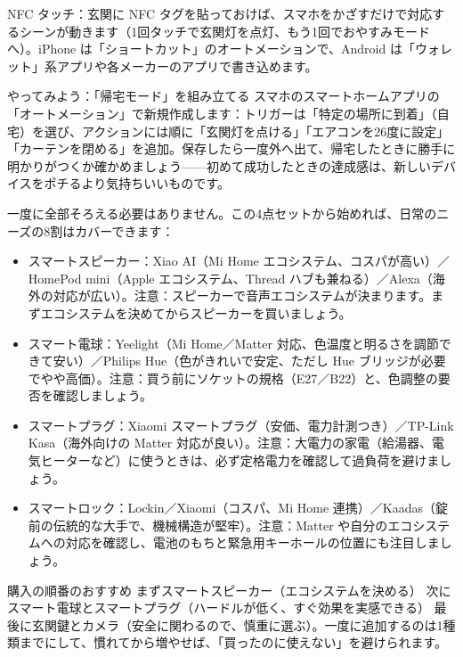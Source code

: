 NFC タッチ：玄関に NFC タグを貼っておけば、スマホをかざすだけで対応するシーンが動きます（1回タッチで玄関灯を点灯、もう1回でおやすみモードへ）。iPhone は「ショートカット」のオートメーションで、Android は「ウォレット」系アプリや各メーカーのアプリで書き込めます。

\begin{tcbpractice}{やってみよう：「帰宅モード」を組み立てる}
スマホのスマートホームアプリの「オートメーション」で新規作成します：トリガーは「特定の場所に到着」（自宅）を選び、アクションには順に「玄関灯を点ける」「エアコンを26度に設定」「カーテンを閉める」を追加。保存したら一度外へ出て、帰宅したときに勝手に明かりがつくか確かめましょう——初めて成功したときの達成感は、新しいデバイスをポチるより気持ちいいものです。

\end{tcbpractice}


一度に全部そろえる必要はありません。この4点セットから始めれば、日常のニーズの8割はカバーできます：

\begin{itemize}
  \item スマートスピーカー：Xiao AI（Mi Home エコシステム、コスパが高い）／HomePod mini（Apple エコシステム、Thread ハブも兼ねる）／Alexa（海外の対応が広い）。注意：スピーカーで音声エコシステムが決まります。まずエコシステムを決めてからスピーカーを買いましょう。
  \item スマート電球：Yeelight（Mi Home／Matter 対応、色温度と明るさを調節できて安い）／Philips Hue（色がきれいで安定、ただし Hue ブリッジが必要でやや高価）。注意：買う前にソケットの規格（E27／B22）と、色調整の要否を確認しましょう。
  \item スマートプラグ：Xiaomi スマートプラグ（安価、電力計測つき）／TP-Link Kasa（海外向けの Matter 対応が良い）。注意：大電力の家電（給湯器、電気ヒーターなど）に使うときは、必ず定格電力を確認して過負荷を避けましょう。
  \item スマートロック：Lockin／Xiaomi（コスパ、Mi Home 連携）／Kaadas（錠前の伝統的な大手で、機械構造が堅牢）。注意：Matter や自分のエコシステムへの対応を確認し、電池のもちと緊急用キーホールの位置にも注目しましょう。
\end{itemize}

\begin{tcbinfo}{購入の順番のおすすめ}
まずスマートスピーカー（エコシステムを決める） 次にスマート電球とスマートプラグ（ハードルが低く、すぐ効果を実感できる） 最後に玄関鍵とカメラ（安全に関わるので、慎重に選ぶ）。一度に追加するのは1種類までにして、慣れてから増やせば、「買ったのに使えない」を避けられます。

\end{tcbinfo}

